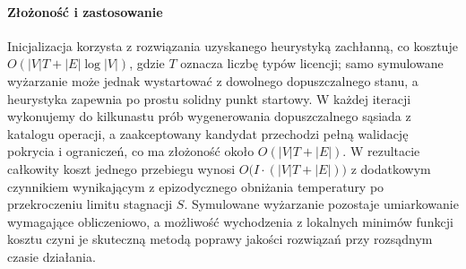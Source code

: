 \paragraph{Złożoność i zastosowanie}
Inicjalizacja korzysta z rozwiązania uzyskanego heurystyką zachłanną, co kosztuje $O(|V|T + |E|\log |V|)$, gdzie $T$ oznacza liczbę typów licencji; samo symulowane wyżarzanie może jednak wystartować z dowolnego dopuszczalnego stanu, a heurystyka zapewnia po prostu solidny punkt startowy. W każdej iteracji wykonujemy do kilkunastu prób wygenerowania dopuszczalnego sąsiada z katalogu operacji, a zaakceptowany kandydat przechodzi pełną walidację pokrycia i ograniczeń, co ma złożoność około $O(|V|T + |E|)$. W rezultacie całkowity koszt jednego przebiegu wynosi $O\bigl(I \cdot (|V|T + |E|)\bigr)$ z dodatkowym czynnikiem wynikającym z epizodycznego obniżania temperatury po przekroczeniu limitu stagnacji $S$. Symulowane wyżarzanie pozostaje umiarkowanie wymagające obliczeniowo, a możliwość wychodzenia z lokalnych minimów funkcji kosztu czyni je skuteczną metodą poprawy jakości rozwiązań przy rozsądnym czasie działania.
